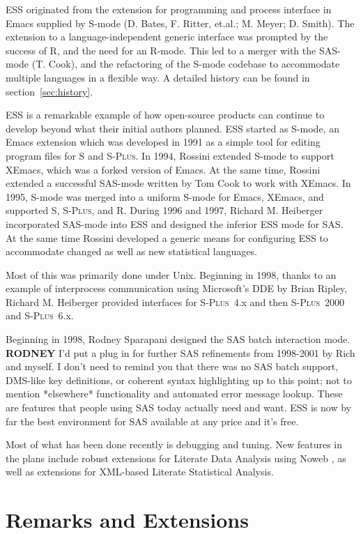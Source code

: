 \documentclass{article}
\newcommand*{\Splus}{\textsc{S-Plus}}
\begin{document}
ESS originated from the extension for programming and process
interface in Emacs supplied by S-mode (D. Bates, F. Ritter, et.al.; 
M. Meyer; D. Smith).  The extension to a language-independent generic
interface was prompted by the success of R, and the need for an
R-mode.  This led to a merger with the SAS-mode (T. Cook), and the
refactoring of the S-mode codebase to accommodate multiple languages
in a flexible way.  A detailed history can be found in
section~\ref{sec:history}.

ESS is a remarkable example of how open-source products can continue
to develop beyond what their initial authors planned.  ESS started as
S-mode, an Emacs extension which was developed in 1991 as a simple
tool for editing program files for S and \Splus.  In 1994, Rossini
extended S-mode to support XEmacs, which was a forked version of
Emacs.  At the same time, Rossini extended a successful SAS-mode
written by Tom Cook to work with XEmacs.  In 1995, S-mode was merged
into a uniform S-mode for Emacs, XEmacs, and supported S, \Splus, and
R. During 1996 and 1997, Richard M. Heiberger incorporated 
SAS-mode into ESS and designed the inferior ESS mode for SAS.
At the same time Rossini developed a
generic means for configuring ESS to accommodate changed as well as
new statistical languages.

Most of this was primarily done under Unix.  Beginning in 1998, thanks
to an example of interprocess communication using Microsoft's DDE by
Brian Ripley, Richard M. Heiberger provided interfaces for \Splus~4.x
and then \Splus~2000 and \Splus~6.x.  

Beginning in 1998, Rodney Sparapani designed the SAS batch interaction
mode.  \textbf{RODNEY} I'd put a plug in for further SAS refinements
from 1998-2001 by Rich and myself.  I don't need to remind you that
there was no SAS batch support, DMS-like key definitions, or coherent
syntax highlighting up to this point; not to mention *elsewhere*
functionality and automated error message lookup.  These are features
that people using SAS today actually need and want.  ESS is now by far
the best environment for SAS available at any price and it's free.

Most of what has been done recently is debugging and tuning.  New
features in the plans include robust extensions for Literate Data
Analysis using Noweb \citep{NRamsey:1994}, as well as extensions for
XML-based Literate Statistical Analysis.

\section{Remarks and Extensions}
\label{sec:remarks}
\end{document}
